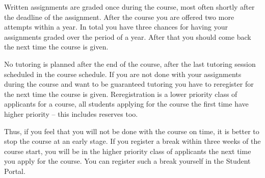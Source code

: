 Written assignments are graded once during the course, most often shortly after 
the deadline of the assignment.
After the course you are offered two more attempts within a year.
In total you have three chances for having your assignments graded over the 
period of a year.
After that you should come back the next time the course is given.

No tutoring is planned after the end of the course, \ie after the last 
tutoring session scheduled in the course schedule.
If you are not done with your assignments during the course and want to be 
guaranteed tutoring you have to reregister for the next time the course is 
given.
Reregistration is a lower priority class of applicants for a course, all 
students applying for the course the first time have higher priority -- this 
includes reserves too.


Thus, if you feel that you will not be done with the course on time, it is 
better to stop the course at an early stage.
If you register a break within three weeks of the course start, you will be in 
the higher priority class of applicants the next time you apply for the course.
You can register such a break yourself in the Student Portal.


